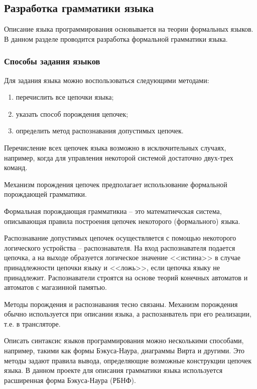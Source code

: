 \subsection{Разработка грамматики языка}

Описание языка программирования основывается на теории формальных языков.
В данном разделе проводится разработка формальной грамматики языка.


\subsubsection{Способы задания языков}

Для задания языка можно воспользоваться следующими методами:

\begin{enumerate}
    \item перечислить все цепочки языка;
    \item указать способ порождения цепочек;
    \item определить метод распознавания допустимых цепочек.
\end{enumerate}

Перечисление всех цепочек языка возможно в исключительных случаях, например,
когда для управления некоторой системой достаточно двух-трех команд.

Механизм порождения цепочек предполагает использование формальной порождающей грамматики.

Формальная порождающая грамматикиа -- это математиечская система, описывающая правила построения цепочек некоторого (формального) языка.

Распознавание допустимых цепочек осуществляется с помощью некоторого логического устройства -- распознавателя.
На вход распознавателя подается цепочка, а на выходе образуется логическое значение <<истина>> в случае принадлежности цепочки языку
и <<ложь>>, если цепочка языку не принадлежит.
Распознаватели строятся на основе теорий конечных автоматов и автоматов с магазинной памятью.

Методы порождения и распознавания тесно связаны.
Механизм порождения обычно используется при описании языка, а распозанватель при его реализации, т.е. в трансляторе.

Описать синтаксис языков программирования можно несколькими способами, например, такими как формы Бэкуса-Наура, диаграммы Вирта и другими.
Это методы задают правила вывода, определяющие возможные конструкции цепочек языка.
В данном проекте для описания грамматики языка используется расширенная форма Бэкуса-Наура (РБНФ).



